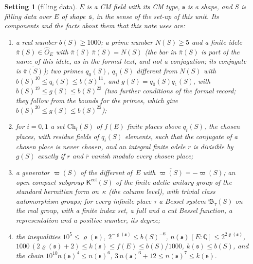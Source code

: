 \documentclass[11pt,a4paper]{article}
\newcommand{\Q}{\mathbb{Q}}
\newcommand{\m}[1]{\mbox{$#1$}}        %
\theoremstyle{plainx}
\theoremstyle{uprightx}
\newtheorem{setting}[theorem]{Setting}          %
\newcommand{\fs}{\mathfrak{s}}                      %
\newcommand{\hO}{\hat{O}_E}
\newcommand{\rh}[1]{\varrho(#1)}                    %
\newcommand{\kk}[1]{k(#1)}                          %
\newcommand{\nn}[1]{n(#1)}                          %
\newcommand{\ninf}[1]{f(#1)}                        %
\newcommand{\bS}[1]{b(#1)}                          %
\newcommand{\NS}[1]{N(#1)}                          %
\newcommand{\qS}[2]{q_{#2}(#1)}                     %
\newcommand{\gS}[1]{g(#1)}                          %
\newcommand{\piS}[1]{\bar\pi(#1)}                   %
\newcommand{\vpS}[1]{\varpi(#1)}                    %
\newcommand{\ChS}[2]{\mathrm{Ch}_{#2}(#1)}          %
\newcommand{\KcolS}[1]{\mathsf{K}^{\mathrm{col}}(#1)}        %
\newcommand{\BsysS}[2]{\mathfrak{B}_{#2}(#1)}       %
\begin{document}
\begin{setting}[filling data]\label{s:S}
$E$ is a CM field with its CM type, $\fs$ is a shape, and $S$ is filling data over $E$ of shape~$\fs$, in the
sense of the set-up of this unit. Its components and the facts about them that this note uses are:
\begin{enumerate}[label=\textup{(\roman*)},leftmargin=2.3em,itemsep=2pt]
\item a real number \m{\bS{S}\ge1000}; a prime number \m{\NS{S}\ge5} and a finite idele \m{\piS{S}\in\hO} with
$\piS{S}\,\overline{\piS{S}}=\NS{S}$ (the bar in \m{\piS{S}} is part of the name of this idele, as in the formal
text, and not a conjugation; its conjugate is \m{\overline{\piS{S}}}); two primes \m{\qS{S}{0}}, \m{\qS{S}{1}}
different from \m{\NS{S}} with $\bS{S}^{10}\le\qS{S}{i}\le\bS{S}^{11}$, and $\gS{S}=\qS{S}{0}\qS{S}{1}$, with
$\bS{S}^{19}\le\gS{S}\le\bS{S}^{23}$ (two further conditions of the formal record; they follow from the bounds
for the primes, which give \m{\bS{S}^{20}\le\gS{S}\le\bS{S}^{22}});
\item for \m{i=0,1} a set \m{\ChS{S}{i}} of \m{\ninf{E}} finite places above \m{\qS{S}{i}}, the \emph{chosen
places}, with residue fields of \m{\qS{S}{i}} elements, such that the conjugate of a chosen place is never chosen,
and an integral finite adele $r$ is divisible by \m{\gS{S}} exactly if $r$ and $\bar r$ vanish modulo every chosen
place;
\item a generator \m{\vpS{S}} of the different of~$E$ with \m{\overline{\vpS{S}}=-\vpS{S}}; an open compact
subgroup \m{\KcolS{S}} of the finite adelic unitary group of the standard hermitian form on~$\kappa$ (the
\emph{column level}), with trivial class automorphism groups; for every infinite place $\tau$ a Bessel system
\m{\BsysS{S}{\tau}} on the real group, with a finite index set, a full and a cut Bessel function, a
representation and a positive number, its degree;
\item the inequalities \m{10^5\le\rh{\fs}}, \m{2^{-\rh{\fs}}\le\bS{S}^{-6}},
\m{\nn{\fs}\,[E:\Q]\le2^{2\rh{\fs}}}, $1000\,(2\rh{\fs}+2)\le\kk{\fs}\le\ninf{E}\le\bS{S}/1000$,
\m{\kk{\fs}\le\bS{S}}, and the chain \m{10^{10}\nn{\fs}^4\le\nn{\fs}^6}, \m{3\,\nn{\fs}^6+12\le\nn{\fs}^7\le\kk{\fs}}.
\end{enumerate}
\end{setting}
\end{document}
